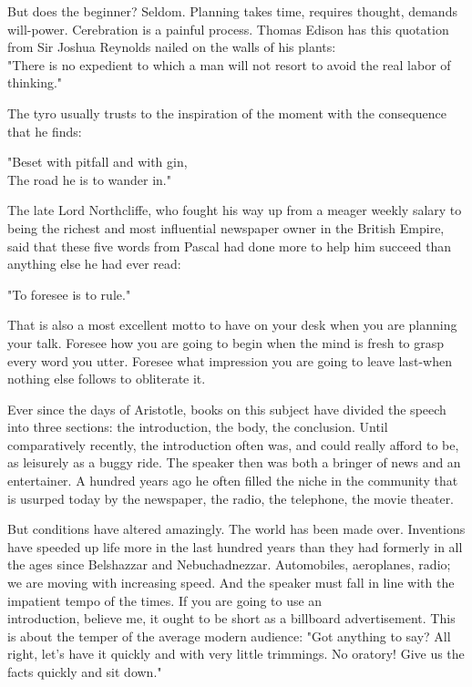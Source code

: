 \documentclass[10pt]{article}
\begin{document}
But does the beginner? Seldom. Planning takes time, requires thought, demands will-power. Cerebration is a painful process. Thomas Edison has this quotation from Sir Joshua Reynolds nailed on the walls of his plants:\\
"There is no expedient to which a man will not resort to avoid the real labor of thinking."

The tyro usually trusts to the inspiration of the moment with the consequence that he finds:

\begin{displayquote}
"Beset with pitfall and with gin,\\
The road he is to wander in."
\end{displayquote}

The late Lord Northcliffe, who fought his way up from a meager weekly salary to being the richest and most influential newspaper owner in the British Empire, said that these five words from Pascal had done more to help him succeed than anything else he had ever read:

\begin{displayquote}
"To foresee is to rule."
\end{displayquote}

That is also a most excellent motto to have on your desk when you are planning your talk. Foresee how you are going to begin when the mind is fresh to grasp every word you utter. Foresee what impression you are going to leave last-when nothing else follows to obliterate it.

Ever since the days of Aristotle, books on this subject have divided the speech into three sections: the introduction, the body, the conclusion. Until comparatively recently, the introduction often was, and could really afford to be, as leisurely as a buggy ride. The speaker then was both a bringer of news and an entertainer. A hundred years ago he often filled the niche in the community that is usurped today by the newspaper, the radio, the telephone, the movie theater.

But conditions have altered amazingly. The world has been made over. Inventions have speeded up life more in the last hundred years than they had formerly in all the ages since Belshazzar and Nebuchadnezzar. Automobiles, aeroplanes, radio; we are moving with increasing speed. And the speaker must fall in line with the impatient tempo of the times. If you are going to use an\\
introduction, believe me, it ought to be short as a billboard advertisement. This is about the temper of the average modern audience: "Got anything to say? All right, let's have it quickly and with very little trimmings. No oratory! Give us the facts quickly and sit down."
\end{document}
